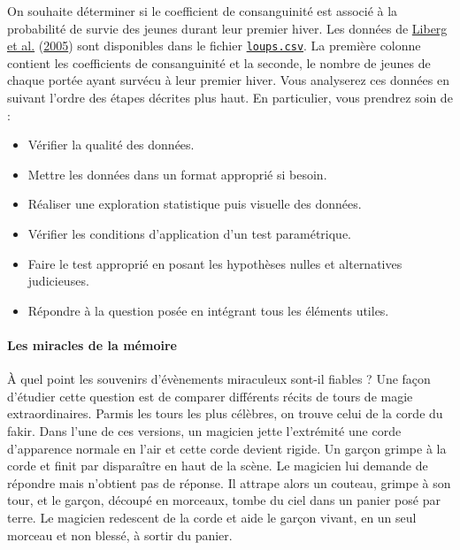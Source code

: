 \documentclass[
  a4paper,
]{article}
\providecommand{\tightlist}{%
  \setlength{\itemsep}{0pt}\setlength{\parskip}{0pt}}
\begin{document}
On souhaite déterminer si le coefficient de consanguinité est associé à la probabilité de survie des jeunes durant leur premier hiver. Les données de \protect\hyperlink{ref-liberg2005}{Liberg et al.} (\protect\hyperlink{ref-liberg2005}{2005}) sont disponibles dans le fichier \href{https://besibo.github.io/Biometrie3/data/loups.csv}{\texttt{loups.csv}}. La première colonne contient les coefficients de consanguinité et la seconde, le nombre de jeunes de chaque portée ayant survécu à leur premier hiver. Vous analyserez ces données en suivant l'ordre des étapes décrites plus haut. En particulier, vous prendrez soin de :

\begin{itemize}
\tightlist
\item
  Vérifier la qualité des données.
\item
  Mettre les données dans un format approprié si besoin.
\item
  Réaliser une exploration statistique puis visuelle des données.
\item
  Vérifier les conditions d'application d'un test paramétrique.
\item
  Faire le test approprié en posant les hypothèses nulles et alternatives judicieuses.
\item
  Répondre à la question posée en intégrant tous les éléments utiles.
\end{itemize}

\hypertarget{les-miracles-de-la-muxe9moire}{%
\paragraph{Les miracles de la mémoire}\label{les-miracles-de-la-muxe9moire}}

À quel point les souvenirs d'évènements miraculeux sont-il fiables ? Une façon d'étudier cette question est de comparer différents récits de tours de magie extraordinaires. Parmis les tours les plus célèbres, on trouve celui de la corde du fakir. Dans l'une de ces versions, un magicien jette l'extrémité une corde d'apparence normale en l'air et cette corde devient rigide. Un garçon grimpe à la corde et finit par disparaître en haut de la scène. Le magicien lui demande de répondre mais n'obtient pas de réponse. Il attrape alors un couteau, grimpe à son tour, et le garçon, découpé en morceaux, tombe du ciel dans un panier posé par terre. Le magicien redescent de la corde et aide le garçon vivant, en un seul morceau et non blessé, à sortir du panier.
\end{document}
